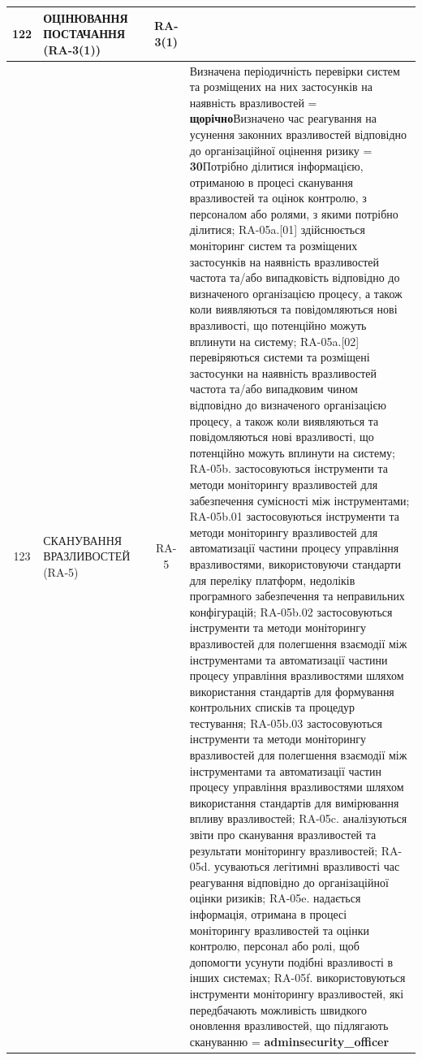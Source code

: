 \documentclass[10pt]{article}
\begin{document}
\begin{longtable}{|c|>{\raggedright\arraybackslash}p{2.5cm}|>{\raggedright\arraybackslash}p{4.5cm}|c|>{\raggedright\arraybackslash}p{4.5cm}|}
122 & ОЦІНЮВАННЯ ПОСТАЧАННЯ (RA-3(1)) &  & RA-3(1) &  \\ \hline
123 & СКАНУВАННЯ ВРАЗЛИВОСТЕЙ (RA-5) &  & RA-5 & Визначена періодичність перевірки систем та розміщених на них застосунків на наявність вразливостей = \textbf{щорічно}\newline Визначено час реагування на усунення законних вразливостей відповідно до організаційної оцінення ризику = \textbf{30}\newline Потрібно ділитися інформацією, отриманою в процесі сканування вразливостей та оцінок контролю, з персоналом або ролями, з якими потрібно ділитися; RA-05a.[01] здійснюється моніторинг систем та розміщених застосунків на наявність вразливостей частота та/або випадковість відповідно до визначеного організацією процесу, а також коли виявляються та повідомляються нові вразливості, що потенційно можуть вплинути на систему; RA-05a.[02] перевіряються системи та розміщені застосунки на наявність вразливостей частота та/або випадковим чином відповідно до визначеного організацією процесу, а також коли виявляються та повідомляються нові вразливості, що потенційно можуть вплинути на систему; RA-05b. застосовуються інструменти та методи моніторингу вразливостей для забезпечення сумісності між інструментами; RA-05b.01 застосовуються інструменти та методи моніторингу вразливостей для автоматизації частини процесу управління вразливостями, використовуючи стандарти для переліку платформ, недоліків програмного забезпечення та неправильних конфігурацій; RA-05b.02 застосовуються інструменти та методи моніторингу вразливостей для полегшення взаємодії між інструментами та автоматизації частини процесу управління вразливостями шляхом використання стандартів для формування контрольних списків та процедур тестування; RA-05b.03 застосовуються інструменти та методи моніторингу вразливостей для полегшення взаємодії між інструментами та автоматизації частин процесу управління вразливостями шляхом використання стандартів для вимірювання впливу вразливостей; RA-05c. аналізуються звіти про сканування вразливостей та результати моніторингу вразливостей; RA-05d. усуваються легітимні вразливості час реагування відповідно до організаційної оцінки ризиків; RA-05e. надається інформація, отримана в процесі моніторингу вразливостей та оцінки контролю, персонал або ролі, щоб допомогти усунути подібні вразливості в інших системах; RA-05f. використовуються інструменти моніторингу вразливостей, які передбачають можливість швидкого оновлення вразливостей, що підлягають скануванню = \textbf{adminsecurity\_\allowbreak{}officer} \\ \hline

\end{longtable}
\end{document}
